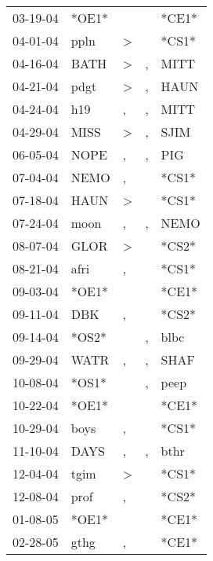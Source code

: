 \begin{supertabular}{lllll}
 03-19-04 &  *OE1* &                  &                  &  *CE1* \\
 04-01-04 &   ppln &     \textgreater &                  &  *CS1* \\
 04-16-04 &   BATH &     \textgreater &                , &   MITT \\
 04-21-04 &   pdgt &     \textgreater &                , &   HAUN \\
 04-24-04 &    h19 &                , &                , &   MITT \\
 04-29-04 &   MISS &     \textgreater &                , &   SJIM \\
 06-05-04 &   NOPE &                , &                , &    PIG \\
 07-04-04 &   NEMO &                , &                  &  *CS1* \\
 07-18-04 &   HAUN &     \textgreater &                  &  *CS1* \\
 07-24-04 &   moon &                , &                , &   NEMO \\
 08-07-04 &   GLOR &     \textgreater &                  &  *CS2* \\
 08-21-04 &   afri &                , &                  &  *CS1* \\
 09-03-04 &  *OE1* &                  &                  &  *CE1* \\
 09-11-04 &    DBK &                , &                  &  *CS2* \\
 09-14-04 &  *OS2* &                  &                , &   blbc \\
 09-29-04 &   WATR &                , &                , &   SHAF \\
 10-08-04 &  *OS1* &                  &                , &   peep \\
 10-22-04 &  *OE1* &                  &                  &  *CE1* \\
 10-29-04 &   boys &                , &                  &  *CS1* \\
 11-10-04 &   DAYS &                , &                , &   bthr \\
 12-04-04 &   tgim &     \textgreater &                  &  *CS1* \\
 12-08-04 &   prof &                , &                  &  *CS2* \\
 01-08-05 &  *OE1* &                  &                  &  *CE1* \\
 02-28-05 &   gthg &                , &                  &  *CE1* \\

\end{supertabular}
